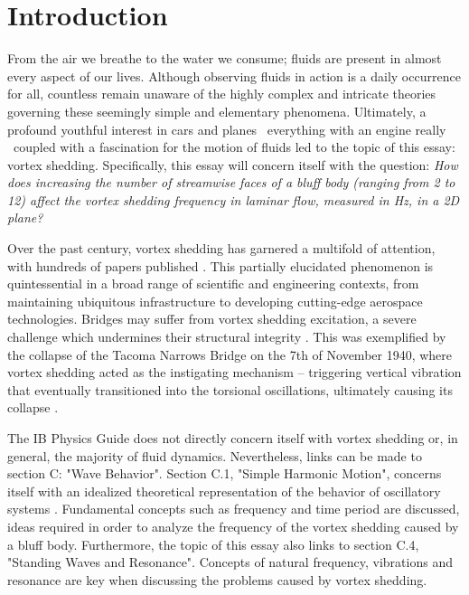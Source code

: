 \section{Introduction}
From the air we breathe to the water we consume; fluids are present in almost every aspect of our lives. Although observing fluids in action is a daily occurrence for all, countless remain unaware of the highly complex and intricate theories governing these seemingly simple and elementary phenomena. Ultimately, a profound youthful interest in cars and planes \textemdash\ everything with an engine really \textemdash\ coupled with a fascination for the motion of fluids led to the topic of this essay: vortex shedding. Specifically, this essay will concern itself with the question: \textit{How does increasing the number of streamwise faces of a bluff body (ranging from 2 to 12) affect the vortex shedding frequency in laminar flow, measured in Hz, in a 2D plane?}

Over the past century, vortex shedding has garnered a multifold of attention, with hundreds of papers published \parencite[61]{buresti1998}. This partially elucidated phenomenon is quintessential in a broad range of scientific and engineering contexts, from maintaining ubiquitous infrastructure to developing cutting-edge aerospace technologies. Bridges may suffer from vortex shedding excitation, a severe challenge which undermines their structural integrity \parencite[1040]{jurado2012}. This was exemplified by the collapse of the Tacoma Narrows Bridge on the 7th of November 1940, where vortex shedding acted as the instigating mechanism -- triggering vertical vibration that eventually transitioned into the torsional oscillations, ultimately causing its collapse \parencite{tacoma_bridge_vibrations}.

The IB Physics Guide \parencite{ib_physics_2025} does not directly concern itself with vortex shedding or, in general, the majority of fluid dynamics. Nevertheless, links can be made to section C: "Wave Behavior". Section C.1, "Simple Harmonic Motion", concerns itself with an idealized theoretical representation of the behavior of oscillatory systems \parencite[313]{allum2023}. Fundamental concepts such as frequency and time period are discussed, ideas required in order to analyze the frequency of the vortex shedding caused by a bluff body. Furthermore, the topic of this essay also links to section C.4, "Standing Waves and Resonance". Concepts of natural frequency, vibrations and resonance are key when discussing the problems caused by vortex shedding.





